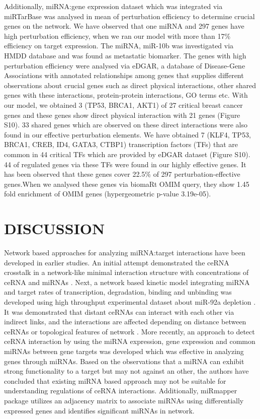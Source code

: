\documentclass[a4,center,fleqn]{NAR}
\begin{document}
Additionally, miRNA:gene expression dataset which was integrated via
miRTarBase \citep{chou2017mirtarbase} was analysed in mean of
perturbation efficiency to determine crucial genes on the network. We
have observed that one miRNA and 297 genes have high perturbation
efficiency, when we ran our model with more than 17\% efficiency on
target expression. The miRNA, miR-10b was investigated via HMDD database
\citep{huang2018hmdd} and was found as metastatic biomarker. The genes
with high perturbation efficiency were analysed via eDGAR, a database of
Disease-Gene Associations with annotated relationships among genes
\citep{babbi2017edgar} that supplies different observations about
crucial genes such as direct physical interactions, other shared genes
with these interactions, protein-protein interactions, GO terms etc.
With our model, we obtained 3 (TP53, BRCA1, AKT1) of 27 critical breast
cancer genes and these genes show direct physical interaction with 21
genes (Figure S10). 33 shared genes which are observed on these direct
interactions were also found in our effective perturbation elements. We
have obtained 7 (KLF4, TP53, BRCA1, CREB, ID4, GATA3, CTBP1)
transcription factors (TFs) that are common in 44 critical TFs which are
provided by eDGAR dataset (Figure S10). 44 of regulated genes via these
TFs were found in our highly effective genes. It has been observed that
these genes cover 22.5\% of 297 perturbation-effective genes.When we 
analysed these genes via biomaRt OMIM query, they show 1.45 fold 
enrichment of OMIM genes (hypergeometric p-value 3.19e-05).

\section{\texorpdfstring{\textbf{DISCUSSION}}{}}

Network based approaches for analyzing miRNA:target interactions have
been developed in earlier studies. An initial attempt demonstrated the
ceRNA crosstalk in a network-like minimal interaction structure with
concentrations of ceRNA and miRNAs \citep{figliuzzi_micrornas_2013}.
Next, a network based kinetic model integrating miRNA and target rates
of transcription, degradation, binding and unbinding was developed
\citep{nitzan_interactions_2014} using high throughput experimental
dataset about miR-92a depletion \citep{helwak_mapping_2013}. It was
demonstrated that distant ceRNAs can interact with each other via
indirect links, and the interactions are affected depending on distance
between ceRNAs or topological features of network
\citep{nitzan_interactions_2014}. More recently, an approach to detect
ceRNA interaction by using the miRNA expression, gene expression and
common miRNAs between gene targets was developed
\citep{markus_list_sponge_2017} which was effective in analyzing genes
through miRNAs. Based on the observations that a miRNA can exhibit
strong functionality to a target but may not against an other, the
authors have concluded that existing miRNA based approach may not be
suitable for understanding regulations of ceRNA interactions.
Additionally, miRmapper package \citep{da2018mirmapper} utilizes an
adjacency matrix to associate miRNAs using differentially expressed
genes and identifies significant miRNAs in network.
\end{document}
